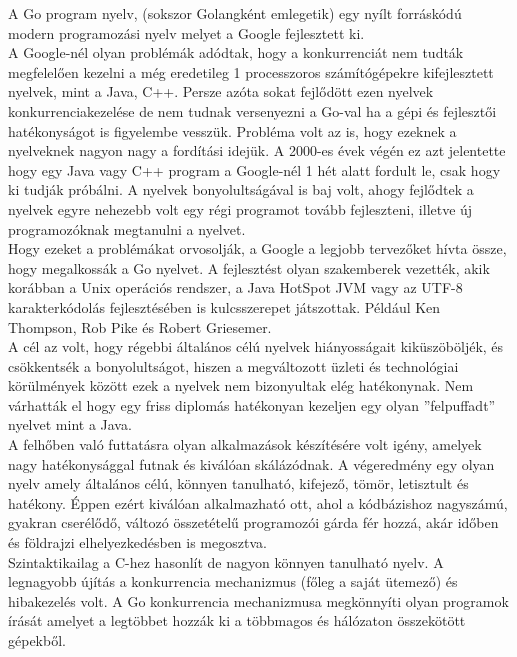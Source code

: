 

A Go program nyelv, (sokszor Golangként emlegetik) egy nyílt forráskódú modern programozási nyelv melyet a Google fejlesztett ki.\\
A Google-nél olyan problémák adódtak, hogy a konkurrenciát nem tudták megfelelően kezelni a még eredetileg
1 processzoros számítógépekre kifejlesztett nyelvek, mint a Java, C++.
Persze azóta sokat fejlődött ezen nyelvek konkurrenciakezelése de nem tudnak versenyezni a Go-val
ha a gépi és fejlesztői hatékonyságot is figyelembe vesszük.
Probléma volt az is, hogy ezeknek a nyelveknek nagyon nagy a fordítási idejük. A 2000-es évek végén ez azt jelentette
hogy egy Java vagy C++ program a Google-nél 1 hét alatt fordult le, csak hogy ki tudják próbálni.
A nyelvek bonyolultságával is baj volt, ahogy fejlődtek a nyelvek egyre nehezebb volt egy régi programot tovább fejleszteni,
illetve új programozóknak megtanulni a nyelvet.\\
Hogy ezeket a problémákat orvosolják, a Google a legjobb tervezőket hívta össze, hogy megalkossák a Go nyelvet.
A fejlesztést olyan szakemberek vezették, akik korábban a Unix operációs rendszer, a Java HotSpot JVM
vagy az UTF-8 karakterkódolás fejlesztésében is kulcsszerepet játszottak.
Például Ken Thompson, Rob Pike és Robert Griesemer.\\
A cél az volt, hogy régebbi általános célú nyelvek hiányosságait kiküszöböljék, és csökkentsék a bonyolultságot, hiszen a megváltozott üzleti és technológiai körülmények
között ezek a nyelvek nem bizonyultak elég hatékonynak.
Nem várhatták el hogy egy friss diplomás hatékonyan kezeljen egy olyan ''felpuffadt'' nyelvet mint a Java.\\
A felhőben való futtatásra olyan alkalmazások készítésére volt igény, amelyek nagy hatékonysággal futnak és kiválóan skálázódnak.
A végeredmény egy olyan nyelv amely általános célú, könnyen tanulható, kifejező, tömör, letisztult és hatékony.
Éppen ezért kiválóan alkalmazható ott, ahol a kódbázishoz nagyszámú, gyakran cserélődő, változó összetételű programozói gárda fér hozzá,
akár időben és földrajzi elhelyezkedésben is megosztva.\\
Szintaktikailag a C-hez hasonlít de nagyon könnyen tanulható nyelv.
A legnagyobb újítás a konkurrencia mechanizmus (főleg a saját ütemező) és hibakezelés volt.
A Go konkurrencia mechanizmusa megkönnyíti olyan programok írását amelyet a legtöbbet hozzák ki a többmagos és hálózaton összekötött gépekből.
